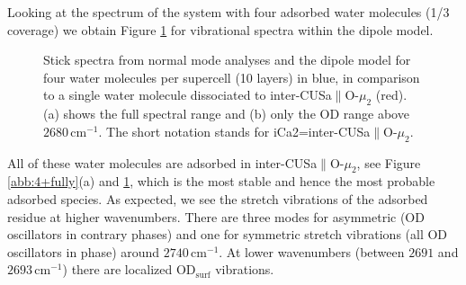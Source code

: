 \documentclass[11pt,DIV=13,BCOR=5mm,a4paper,headinclude]{scrbook}
\begin{document}
Looking at the spectrum of the system with four adsorbed water molecules (1/3 coverage) we obtain Figure \ref{abb:4water} for vibrational spectra within the dipole model.
\begin{figure}[!h]
    \centering
             \quad
             \quad
             \caption{Stick spectra from normal mode analyses and the dipole model for four water molecules per supercell (10 layers) in blue, in comparison to a single water molecule dissociated to inter-CUSa$\parallel$O-$\mu_2$ (red).
(a) shows the full spectral range and (b) only the OD range above $2680\,$cm$^{-1}$.
The short notation stands for iCa2=inter-CUSa$\parallel$O-$\mu_2$.}
            \label{abb:4water}
\end{figure}
All of these water molecules are adsorbed in inter-CUSa$\parallel$O-$\mu_2$, see Figure \ref{abb:4+fully}(a) and \ref{abb:4water}, which is the most stable and hence the most probable adsorbed species.
As expected, we see the stretch vibrations of the adsorbed residue at higher wavenumbers.
There are three modes for asymmetric (OD oscillators in contrary phases) and one for symmetric stretch vibrations (all OD oscillators in phase) around $2740\,$cm$^{-1}$.
At lower wavenumbers (between $2691$ and $2693\,$cm$^{-1}$) there are localized OD$_\textrm{surf}$ vibrations.
\end{document}
